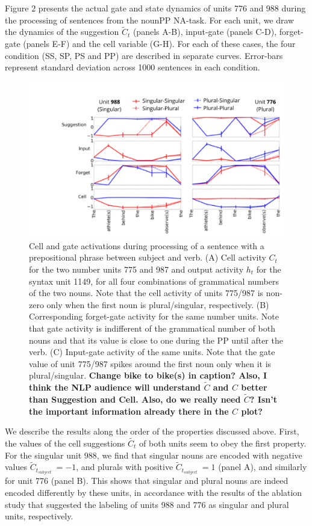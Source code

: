 Figure 2 presents the actual gate and state dynamics of units 776 and 988 during the processing of sentences from the nounPP NA-task. 
For each unit, we draw the dynamics of the suggestion $\tilde{C}_t$ (panels A-B), input-gate (panels C-D), forget-gate (panels E-F) and the cell variable (G-H). 
For each of these cases, the four condition (SS, SP, PS and PP) are described in separate curves. 
Error-bars represent standard deviation across 1000 sentences in each condition.

\begin{figure}[ht]
\includegraphics[width=\textwidth]{Figures/Figure2_number_units_775_987_suggestion_input_forget.png}
\caption{Cell and gate activations during processing of a sentence with a prepositional phrase between subject and verb. 
(A) Cell activity $C_t$ for the two number units 775 and 987 and output activity $h_t$ for the syntax unit 1149, for all four combinations of grammatical numbers of the two nouns. 
Note that the cell activity of units 775/987 is non-zero only when the first noun is plural/singular, respectively. 
(B) Corresponding forget-gate activity for the same number units. 
Note that gate activity is indifferent of the grammatical number of both nouns and that its value is close to one during the PP until after the verb. 
(C) Input-gate activity of the same units. 
Note that the gate value of unit 775/987 spikes around the first noun only when it is plural/singular. \textbf{Change bike to bike(s) in caption? Also, I think the NLP audience will understand $\tilde{C}$ and $C$ better than Suggestion and Cell. Also, do we really need  $\tilde{C}$? Isn't the important information already there in the $C$ plot?}}
\end{figure}


We describe the results along the order of the properties discussed above. 
First, the values of the cell suggestions $\tilde{C_t}$ of both units seem to obey the first property. 
For the singular unit 988, we find that singular nouns are encoded with negative values $\tilde{C}_{t_{subject}}~=-1$, and plurals with positive $\tilde{C}_{t_{subject}}~=1$ (panel A), and similarly for unit 776 (panel B). 
This shows that singular and plural nouns are indeed encoded differently by these units, in accordance with the results of the ablation study that suggested the labeling of units 988 and 776 as singular and plural units, respectively.



